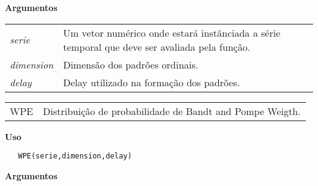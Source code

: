 \documentclass[12pt,letterpaper]{article}
\begin{document}
\textbf{Argumentos}

\begin{table}[!h]
\begin{center}
\begin{tabularx}{\textwidth}{X X}
\hspace{0.5cm} \textit{serie} \vspace{0.5cm}& Um vetor numérico onde estará instânciada a série temporal que deve ser avaliada pela função.\vspace{0.5cm}\\
\hspace{0.5cm} \textit{dimension} \vspace{0.5cm}& Dimensão dos padrões ordinais.\vspace{0.5cm}\\
\hspace{0.5cm} \textit{delay} & Delay utilizado na formação dos padrões.\\
\end{tabularx}
\end{center}
\end{table} 

\newpage


\hrulefill   

\begin{table}[!h]
\begin{center}
\begin{tabularx}{\textwidth}{X X}
\hspace{0.5cm} WPE & Distribuição de probabilidade de Bandt and Pompe Weigth.\\
\end{tabularx}
\end{center}
\end{table} 

\vspace{-0.5cm}

\hrulefill  

\vspace{0.5cm}

\textbf{Uso}

\begin{lstlisting}
   WPE(serie,dimension,delay)
\end{lstlisting}

\vspace{0.5cm}


\textbf{Argumentos}
\end{document}

